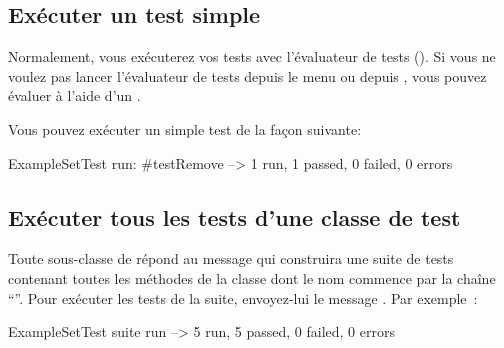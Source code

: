 \documentclass[a4paper,10pt,twoside]{book}
\begin{document}
\subsection{Exécuter un test simple}
Normalement, vous exécuterez vos tests avec l'évaluateur de tests (). Si vous ne voulez pas lancer l'évaluateur de tests depuis le menu  ou depuis \toolsflap, vous pouvez évaluer   à l'aide d'un .

Vous pouvez exécuter un simple test de la façon suivante:
% 

\begin{code}{}
ExampleSetTest run: #testRemove --> 1 run, 1 passed, 0 failed, 0 errors
\end{code}

\subsection{Exécuter tous les tests d'une classe de test}

Toute sous-classe de  répond au message  qui construira une suite de tests contenant toutes les méthodes de la classe dont le nom commence par la chaîne ``''.
Pour exécuter les tests de la suite, envoyez-lui le message .
Par exemple~:

\begin{code}{}
ExampleSetTest suite run --> 5 run, 5 passed, 0 failed, 0 errors
\end{code}

\end{document}
